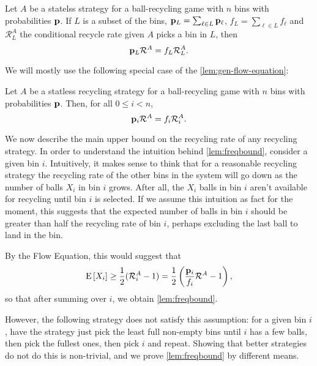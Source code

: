 \begin{lemma} \label{lem:gen-flow-equation}
	Let $A$ be a statelss strategy for a ball-recycling game with $n$ bins with
	probabilities $\mathbf{p}$. If $L$ is a subset of the bins, $\mathbf{p}_L = \sum_{\ell \in
	L} \mathbf{p}_\ell$, $f_L = \sum_{\ell \in L} f_\ell$ and $\mathcal{R}_L^A$ the
	conditional recycle rate given $A$ picks a bin in $L$, then
	\begin{equation}
		\mathbf{p}_L\mathcal{R}^A = f_L\mathcal{R}_L^A.
	\end{equation}
\end{lemma}

We will mostly use the following special case of the
\cref{lem:gen-flow-equation}: 

\begin{lemma} \label{lem:flow-equation}
	Let $A$ be a statless recycling strategy for a ball-recycling game with $n$
	bins with probabilities $\mathbf{p}$.  Then, for all $0\leq i < n$,
	\begin{equation}
		\mathbf{p}_i\mathcal{R}^A = f_i\mathcal{R}_i^A.
	\end{equation}
\end{lemma}

We now describe the main upper bound on the recycling rate of any recycling
strategy. In order to understand the intuition behind \cref{lem:freqbound},
consider a given bin $i$. Intuitively, it makes sense to think that for a
reasonable recycling strategy the recycling rate of the other bins in the
system will go down as the number of balls $X_i$ in bin $i$ grows.  After all,
the $X_i$ balls in bin $i$ aren't available for recycling until bin $i$ is
selected. If we assume this intuition as fact for the moment, this suggests
that the expected number of balls in bin $i$ should be greater than half the
recycling rate of bin $i$, perhaps excluding the last ball to land in the bin.

By the Flow Equation, this would suggest that
\[ \mathrm{E}\left[X_i\right] \geq \frac{1}{2}(\mathcal{R}_i^A - 1) =
\frac{1}{2}\left(\frac{\mathbf{p}_i}{f_i}\mathcal{R}^A - 1\right), \]
so that after summing over $i$, we obtain \cref{lem:freqbound}.

However, the following strategy does not satisfy this assumption: for a given
bin $i$, have the strategy just pick the least full non-empty bins until $i$
has a few balls, then pick the fullest ones, then pick $i$ and repeat. Showing
that better strategies do not do this is non-trivial, and we prove
\cref{lem:freqbound} by different means.

